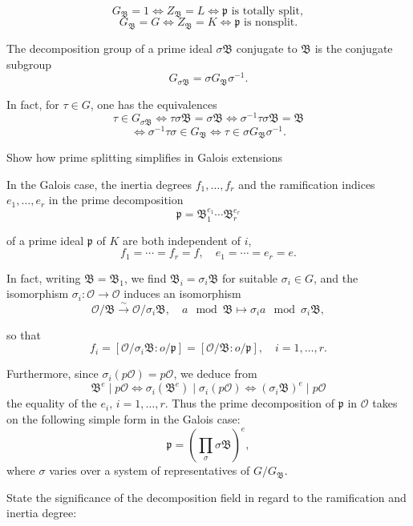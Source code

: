 \[
G_{\mathfrak{B}} = 1 \iff Z_{\mathfrak{B}} = L \iff \mathfrak{p} \text{ is totally split},
\]
\[
G_{\mathfrak{B}} = G \iff Z_{\mathfrak{B}} = K \iff \mathfrak{p} \text{ is nonsplit}.
\]

The decomposition group of a prime ideal \(\sigma \mathfrak{B}\) conjugate to \(\mathfrak{B}\) is the conjugate subgroup
\[
G_{\sigma \mathfrak{B}} = \sigma G_{\mathfrak{B}} \sigma^{-1}.
\]

In fact, for \(\tau \in G\), one has the equivalences
\[
\tau \in G_{\sigma \mathfrak{B}} \iff \tau \sigma \mathfrak{B} = \sigma \mathfrak{B} \iff \sigma^{-1} \tau \sigma \mathfrak{B} = \mathfrak{B}
\]
\[
\iff \sigma^{-1} \tau \sigma \in G_{\mathfrak{B}} \iff \tau \in \sigma G_{\mathfrak{B}} \sigma^{-1}.
\]

Show how prime splitting simplifies in Galois extensions


In the Galois case, the inertia degrees \( f_1, \ldots, f_r \) and the ramification indices \( e_1, \ldots, e_r \) in the prime decomposition
\[
\mathfrak{p} = \mathfrak{B}_1^{e_1} \cdots \mathfrak{B}_r^{e_r}
\]

of a prime ideal \(\mathfrak{p}\) of \(K\) are both independent of \(i\),
\[
f_1 = \cdots = f_r = f, \quad e_1 = \cdots = e_r = e.
\]

In fact, writing \(\mathfrak{B} = \mathfrak{B}_1\), we find \(\mathfrak{B}_i = \sigma_i \mathfrak{B}\) for suitable \(\sigma_i \in G\), 
and the isomorphism \(\sigma_i : \mathcal{O} \to \mathcal{O}\) induces an isomorphism
\[
\mathcal{O}/\mathfrak{B} \xrightarrow{\sim} \mathcal{O}/\sigma_i \mathfrak{B}, \quad a \mod \mathfrak{B} \mapsto \sigma_i a \mod \sigma_i \mathfrak{B},
\]

so that
\[
f_i = [\mathcal{O}/\sigma_i \mathfrak{B} : o/\mathfrak{p}] = [\mathcal{O}/\mathfrak{B} : o/\mathfrak{p}], \quad i = 1, \ldots, r.
\]

Furthermore, since \(\sigma_i (p \mathcal{O}) = p \mathcal{O}\), we deduce from
\[
\mathfrak{B}^e \mid p \mathcal{O} \iff \sigma_i (\mathfrak{B}^e) \mid \sigma_i (p \mathcal{O}) \iff (\sigma_i \mathfrak{B})^e \mid p \mathcal{O}
\]
the equality of the \( e_i, \, i = 1, \ldots, r \). 
Thus the prime decomposition of \(\mathfrak{p}\) in \(\mathcal{O}\) takes on the following simple form in the Galois case:
\[
\mathfrak{p} = \left( \prod_{\sigma} \sigma \mathfrak{B} \right)^e,
\]
where \(\sigma\) varies over a system of representatives of \(G/G_{\mathfrak{B}}\). 



State the significance of the decomposition field in regard to the ramification and inertia degree:

